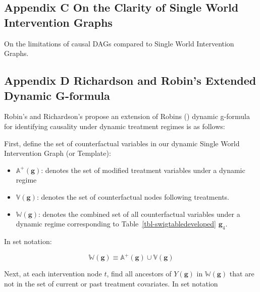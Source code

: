 \documentclass[
  single column]{article}
\providecommand{\tightlist}{%
  \setlength{\itemsep}{0pt}\setlength{\parskip}{0pt}}\usepackage{longtable,booktabs,array}
\begin{document}
\subsection{Appendix C On the Clarity of Single World Intervention
Graphs}\label{appendix-c-on-the-clarity-of-single-world-intervention-graphs}

\newpage{}

\begin{table}

\caption{\label{tbl-pearltable}On the limitations of causal DAGs
compared to Single World Intervention Graphs.}

\centering{

\pearltable

}

\end{table}%

\subsection{Appendix D Richardson and Robin's Extended Dynamic
G-formula}\label{appendix-d-richardson-and-robins-extended-dynamic-g-formula}

Robin's and Richardson's propose an extension of Robins
() dynamic g-formula for identifying
causality under dynamic treatment regimes is as follows:

First, define the set of counterfactual variables in our dynamic Single
World Intervention Graph (or Template):

\begin{itemize}
\tightlist
\item
  \(\mathbb{A}^+(\mathbf{g})\): denotes the set of modified treatment
  variables under a dynamic regime
\item
  \(\mathbb{V}(\mathbf{g})\): denotes the set of counterfactual nodes
  following treatments.
\item
  \(\mathbb{W}(\mathbf{g})\): denotes the combined set of all
  counterfactual variables under a dynamic regime corresponding to
  Table~\ref{tbl-swigtabledeveloped} \(\mathbf{g}_4\).
\end{itemize}

In set notation:

\[
\mathbb{W}(\mathbf{g}) \equiv \mathbb{A}^+(\mathbf{g}) \cup \mathbb{V}(\mathbf{g})
\]

Next, at each intervention node \(t\), find all ancestors of
\(Y(\mathbf{g})\) in \(\mathbb{W}(\mathbf{g})\) that are not in the set
of current or past treatment covariates. In set notation
\end{document}
